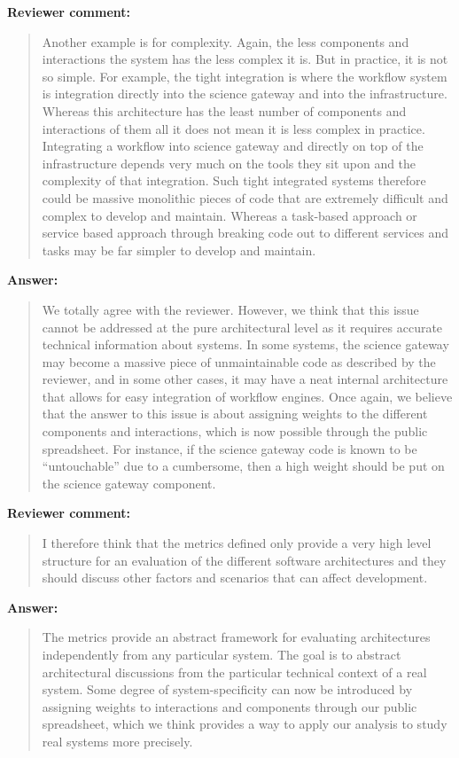 \documentclass[a4]{article}
\newenvironment{review}%
{\textbf{Reviewer comment:}\begin{quote}}%
{\end{quote}}%
\newenvironment{answer}%
{\textbf{Answer:}\begin{small}\begin{quote}}%
{\end{quote}\end{small}}%
\begin{document}
\begin{review}
  Another example is for complexity.  Again, the less components and
  interactions the system has the less complex it is. But in practice,
  it is not so simple. For example, the tight integration is where the
  workflow system is integration directly into the science gateway and
  into the infrastructure. Whereas this architecture has the least
  number of components and interactions of them all it does not mean
  it is less complex in practice. Integrating a workflow into science
  gateway and directly on top of the infrastructure depends very much
  on the tools they sit upon and the complexity of that
  integration. Such tight integrated systems therefore could be
  massive monolithic pieces of code that are extremely difficult and
  complex to develop and maintain.  Whereas a task-based approach or
  service based approach through breaking code out to different
  services and tasks may be far simpler to develop and maintain.
\end{review}

\begin{answer}
  We totally agree with the reviewer. However, we think that this
  issue cannot be addressed at the pure architectural level as it
  requires accurate technical information about systems. In some
  systems, the science gateway may become a massive piece of
  unmaintainable code as described by the reviewer, and in some other
  cases, it may have a neat internal architecture that allows for easy
  integration of workflow engines. Once again, we believe that the
  answer to this issue is about assigning weights to the different
  components and interactions, which is now possible through the
  public spreadsheet. For instance, if the science gateway code is
  known to be ``untouchable'' due to a cumbersome, then a high weight
  should be put on the science gateway component. 
\end{answer}

\begin{review}
  I therefore think that the metrics defined only provide a very high
  level structure for an evaluation of the different software
  architectures and they should discuss other factors and scenarios
  that can affect development. 
\end{review}

\begin{answer}
  The metrics provide an abstract framework for evaluating
  architectures independently from any particular system. The goal is
  to abstract architectural discussions from the particular technical
  context of a real system. Some degree of system-specificity can now
  be introduced by assigning weights to interactions and components
  through our public spreadsheet, which we think provides a way to apply our
  analysis to study real systems more precisely.
\end{answer}
\end{document}
